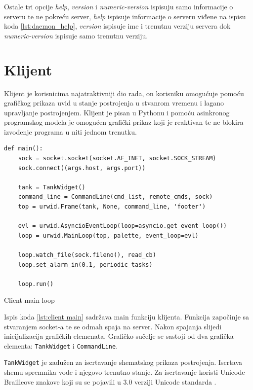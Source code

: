 Ostale tri opcije \emph{help}, \emph{version} i \emph{numeric-version} ispisuju
samo informacije o serveru te ne pokreću server, \emph{help} ispisuje
informacije o serveru viđene na ispisu koda \ref{lst:daemon_help},
\emph{version} ispisuje ime i trenutnu verziju servera dok
\emph{numeric-version} ispisuje samo trenutnu verziju.

\newpage
\section{Klijent}

Klijent je korisnicima najatraktivniji dio rada, on korisniku omogućuje pomoću
grafičkog prikaza uvid u stanje postrojenja u stvanrom vremenu i lagano
upravljanje postrojenjem. Klijent je pisan u Pythonu i pomoću asinkronog
programskog modela je omogućen grafički prikaz koji je reaktivan te ne blokira
izvođenje programa u niti jednom trenutku.

\begin{listing}[H]
\centering
\begin{verbatim}
def main():
    sock = socket.socket(socket.AF_INET, socket.SOCK_STREAM)
    sock.connect((args.host, args.port))

    tank = TankWidget()
    command_line = CommandLine(cmd_list, remote_cmds, sock)
    top = urwid.Frame(tank, None, command_line, 'footer')

    evl = urwid.AsyncioEventLoop(loop=asyncio.get_event_loop())
    loop = urwid.MainLoop(top, palette, event_loop=evl)

    loop.watch_file(sock.fileno(), read_cb)
    loop.set_alarm_in(0.1, periodic_tasks)

    loop.run()
\end{verbatim}
\caption{Client main loop}
\label{lst:client main}
\end{listing}

Ispis koda \ref{lst:client main} sadržava main funkciju klijenta. Funkcija
započinje sa stvaranjem socket-a te se odmah spaja na server. Nakon spajanja
slijedi inicijalizacija grafičkih elemenata. Grafičko sučelje se sastoji od dva
grafička elementa: \texttt{TankWidget} i \texttt{CommandLine}.

\texttt{TankWidget} je zadužen za iscrtavanje shematskog prikaza
postrojenja. Iscrtava shemu spremnika vode i njegovo trenutno stanje. Za
iscrtavanje koristi Unicode Brailleove znakove koji su se pojavili u 3.0 verziji
Unicode standarda \cite{unicode}.

